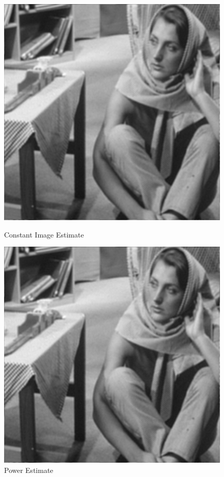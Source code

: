 \documentclass{article}
\begin{document}
    \phantom{}
    
    \begin{figure}[!htb]
      \includegraphics[scale=.45]{./deblurring/estimate/constant.png}
      \caption{Constant Image Estimate}
    \endminipage \hfill
      \includegraphics[scale=.45]{./deblurring/estimate/power.png}
      \caption{Power Estimate}
    \endminipage
    \end{figure}
\end{document}

